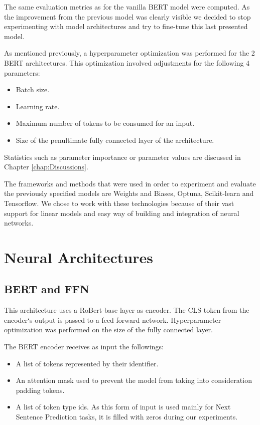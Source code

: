 \documentclass[12pt,a4paper]{report}
\begin{document}
The same evaluation metrics as for the vanilla BERT model were computed. As the improvement from the previous model was clearly visible we decided to stop experimenting with model architectures and try to fine-tune this last presented model. 

As mentioned previously, a hyperparameter optimization was performed for the 2 BERT architectures. This optimization involved adjustments for the following 4 parameters:
\begin{itemize}
    \item Batch size.
    \item Learning rate.
    \item Maximum number of tokens to be consumed for an input.
    \item Size of the penultimate fully connected layer of the architecture.
\end{itemize}

Statistics such as parameter importance or parameter values are discussed in Chapter \ref{chap:Discussions}.

The frameworks and methods that were used in order to experiment and evaluate the previously specified models are Weights and Biases, Optuna, Scikit-learn and Tensorflow. We chose to work with these technologies because of their vast support for linear models and easy way of building and integration of neural networks.


\section{Neural Architectures}

\subsection{BERT and FFN}
\label{sec:bert-ffn}
This architecture uses a RoBert-base layer as encoder. The CLS token from the encoder`s output is passed to a feed forward network. Hyperparameter optimization was performed on the size of the fully connected layer.

The BERT encoder receives as input the followings:
\begin{itemize}
    \item A list of tokens represented by their identifier.
    \item An attention mask used to prevent the model from taking into consideration padding tokens.
    \item A list of token type ids. As this form of input is used mainly for Next Sentence Prediction tasks, it is filled with zeros during our experiments.
\end{itemize}
\end{document}

